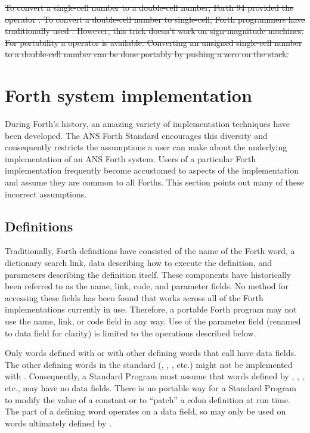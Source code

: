 \sout{%
To convert a single-cell number to a double-cell number, Forth 94
provided the operator . To convert a double-cell number to
single-cell, Forth programmers have traditionally used .
However, this trick doesn't work on sign-magnitude machines. For
portability a  operator is available. Converting an
unsigned single-cell number to a double-cell number can be done portably
by pushing a zero on the stack.
}
\cbend


\section{Forth system implementation} %

During Forth's history, an amazing variety of implementation techniques
have been developed. The ANS Forth Standard encourages this diversity
and consequently restricts the assumptions a user can make about the
underlying implementation of an ANS Forth system. Users of a particular
Forth implementation frequently become accustomed to aspects of the
implementation and assume they are common to all Forths. This section
points out many of these incorrect assumptions.

\subsection{Definitions} %

Traditionally, Forth definitions have consisted of the name of the
Forth word, a dictionary search link, data describing how to execute
the definition, and parameters describing the definition itself. These
components have historically been referred to as the name, link, code,
and parameter fields.
No method for accessing these fields has been found that works
across all of the Forth implementations currently in use. Therefore,
a portable Forth program may not use the name, link, or code field
in any way. Use of the parameter field (renamed to data field for
clarity) is limited to the operations described below.

Only words defined with  or with other defining words
that call  have data fields. The other defining words
in the standard (, , \word{:}, etc.)
might not be implemented with . Consequently, a Standard
Program must assume that words defined by ,
, \word{:}, etc., may have no data fields. There is no
portable way for a Standard Program to modify the value of a constant or to
``patch'' a colon definition at run time.
The  part of a defining word operates on a data field,
so  may only be used on words ultimately defined by .


